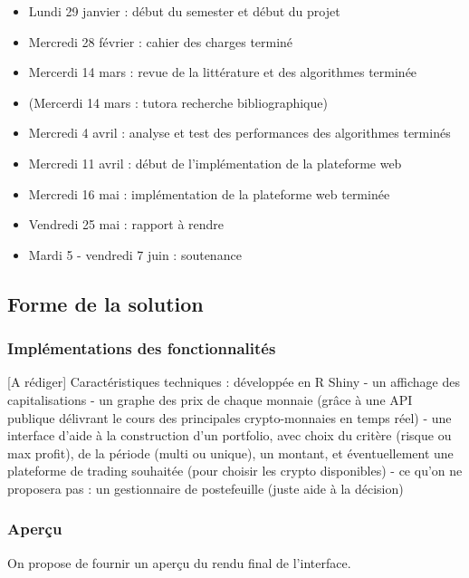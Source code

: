 \documentclass[a4paper]{article}
\begin{document}
\begin{itemize}
    \item Lundi 29 janvier : début du semester et début du projet
    \item Mercredi 28 février : cahier des charges terminé
    \item Mercerdi 14 mars : revue de la littérature et des algorithmes terminée
    \item (Mercerdi 14 mars : tutora recherche bibliographique)
    \item Mercredi 4 avril : analyse et test des performances des algorithmes terminés
    \item Mercredi 11 avril : début de l'implémentation de la plateforme web
    \item Mercredi 16 mai : implémentation de la plateforme web terminée
    \item Vendredi 25 mai : rapport à rendre
    \item Mardi 5 - vendredi 7 juin : soutenance
\end{itemize}

\subsection{Forme de la solution}

\subsubsection{Implémentations des fonctionnalités}

[A rédiger] Caractéristiques techniques : développée en R Shiny
- un affichage des capitalisations
- un graphe des prix de chaque monnaie (grâce à une API publique délivrant le cours des principales crypto-monnaies en temps réel)
- une interface d'aide à la construction d'un portfolio, avec choix du critère (risque ou max profit), de la période (multi ou unique), un montant, et éventuellement une plateforme de trading souhaitée (pour choisir les crypto disponibles)
- ce qu'on ne proposera pas : un gestionnaire de postefeuille (juste aide à la décision)

\subsubsection{Aperçu}

On propose de fournir un aperçu du rendu final de l'interface.

\printbibliography
\end{document}
